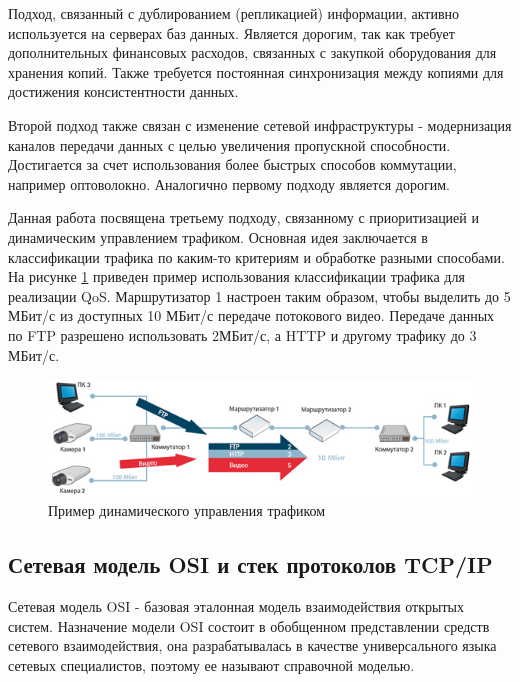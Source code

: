 Подход, связанный с дублированием (репликацией) информации, активно используется на серверах баз данных. Является дорогим, так как требует дополнительных финансовых расходов, связанных с закупкой оборудования для хранения копий. Также требуется постоянная синхронизация между копиями для достижения консистентности данных.

Второй подход также связан с изменение сетевой инфраструктуры - модернизация каналов передачи данных с целью увеличения пропускной способности. Достигается за счет использования более быстрых способов коммутации, например оптоволокно. Аналогично первому подходу является дорогим.

Данная работа посвящена третьему подходу, связанному с приоритизацией и динамическим управлением трафиком. Основная идея заключается в классификации трафика по каким-то критериям и обработке разными способами. На рисунке \ref{pic:qos_simple_example} приведен пример использования классификации трафика для реализации QoS. Маршрутизатор 1 настроен таким образом, чтобы выделить до 5 МБит/с из доступных 10 МБит/с передаче потокового видео. Передаче данных по FTP разрешено использовать 2МБит/с, а HTTP и другому трафику до 3 МБит/с.
\begin{figure}
\centering
\includegraphics[scale=0.7]{pictures/qos_simple_example}
\caption{Пример динамического управления трафиком}
\label{pic:qos_simple_example}
\end{figure}

\subsection{Сетевая модель OSI и стек протоколов TCP/IP}
Сетевая модель OSI - базовая эталонная модель взаимодействия открытых систем. Назначение модели OSI состоит в обобщенном представлении средств сетевого взаимодействия, она разрабатывалась в качестве универсального языка сетевых специалистов, поэтому ее называют справочной моделью.


